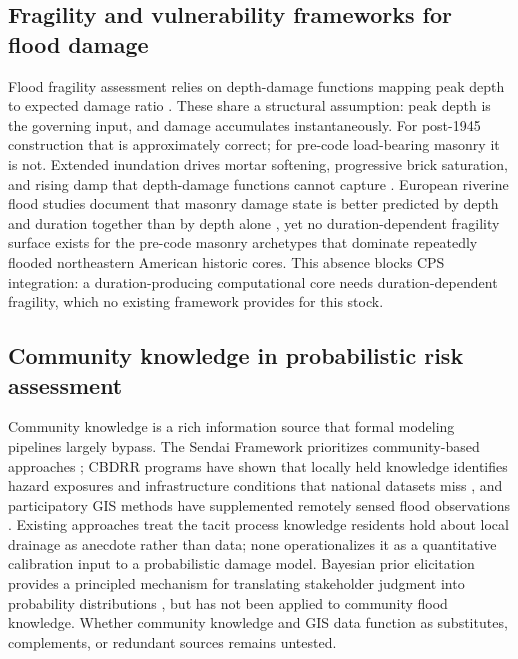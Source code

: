 \documentclass[11pt]{article}
\begin{document}
\subsection{Fragility and vulnerability frameworks for flood damage}
Flood fragility assessment relies on depth-damage functions mapping peak depth to
expected damage ratio \cite{fema2025hazus,huizinga2017jrc,gerl2016review}.
These share a structural assumption: peak depth is the governing input, and damage
accumulates instantaneously. For post-1945 construction that is approximately
correct; for pre-code load-bearing masonry it is not. Extended inundation drives
mortar softening, progressive brick saturation, and rising damp that depth-damage
functions cannot capture
\cite{franzoni2015compressive,sathiparan2018effect,hall2009water,castillo2026moisture,xiao2021flood}.
European riverine flood studies document that masonry damage state is better
predicted by depth and duration together than by depth alone
\cite{kelman2004overview,schwarz2008damage,milanesi2018vulnerability,korswagen2025experimental,moaiyedfar2025collapse}, yet no
duration-dependent fragility surface exists for the pre-code masonry archetypes
that dominate repeatedly flooded northeastern American historic cores.
This absence blocks CPS integration: a duration-producing computational core needs
duration-dependent fragility, which no existing framework provides for this stock.


\vspace{-0.3cm}
\subsection{Community knowledge in probabilistic risk assessment}
Community knowledge is a rich information source that formal
modeling pipelines largely bypass.
The Sendai Framework prioritizes community-based approaches
\cite{undrr2015sendai}; CBDRR programs have shown that locally held knowledge
identifies hazard exposures and infrastructure conditions that national datasets
miss \cite{twigg2015disaster,aldrich2015social,castro2021community}, and participatory GIS methods have supplemented
remotely sensed flood observations \cite{goodchild2007citizens,assumpcao2018citizen,gibson2019engagement}.
Existing approaches treat the tacit process knowledge residents hold about local
drainage as anecdote rather than data; none operationalizes it as a quantitative
calibration input to a probabilistic damage model.
Bayesian prior elicitation provides a principled mechanism for translating
stakeholder judgment into probability distributions
\cite{ohagan2006uncertain,garthwaite2005statistical}, but has not been applied to
community flood knowledge. Whether community knowledge and GIS data function as
substitutes, complements, or redundant sources remains untested.
\end{document}
